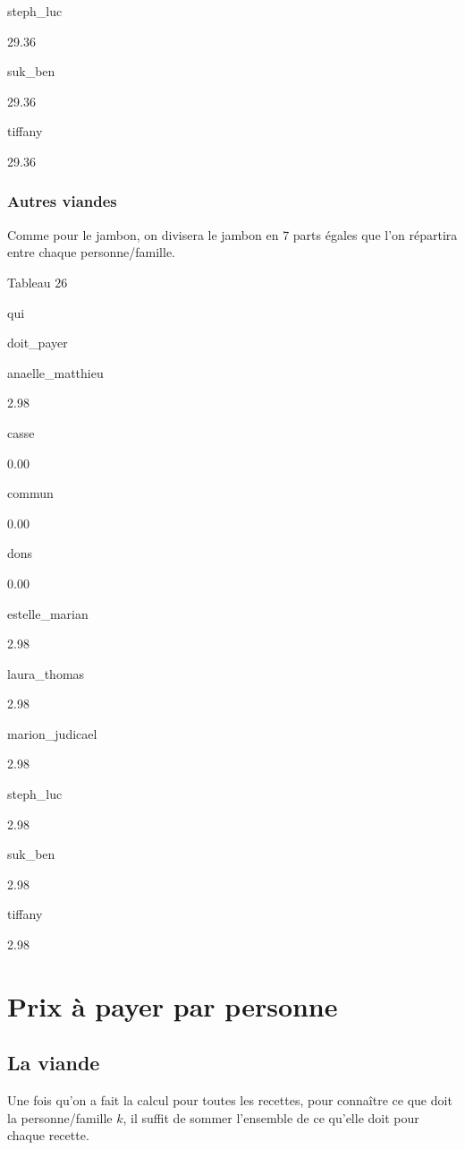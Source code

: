 \documentclass[]{article}
\begin{document}
steph\_luc

29.36

suk\_ben

29.36

tiffany

29.36

\hypertarget{autres-viandes}{%
\subsubsection{Autres viandes}\label{autres-viandes}}

Comme pour le jambon, on divisera le jambon en 7 parts égales que l'on
répartira entre chaque personne/famille.

Tableau 26

qui

doit\_payer

anaelle\_matthieu

2.98

casse

0.00

commun

0.00

dons

0.00

estelle\_marian

2.98

laura\_thomas

2.98

marion\_judicael

2.98

steph\_luc

2.98

suk\_ben

2.98

tiffany

2.98

\hypertarget{prix-a-payer-par-personne}{%
\section{Prix à payer par personne}\label{prix-a-payer-par-personne}}

\hypertarget{la-viande}{%
\subsection{La viande}\label{la-viande}}

Une fois qu'on a fait la calcul pour toutes les recettes, pour connaître
ce que doit la personne/famille \(k\), il suffit de sommer l'ensemble de
ce qu'elle doit pour chaque recette.
\end{document}
